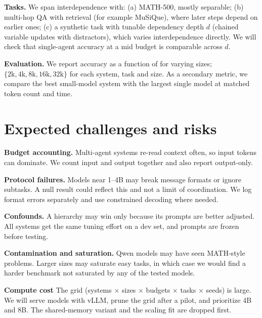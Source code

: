 \documentclass{article}
\begin{document}
\textbf{Tasks.} We span interdependence with: (a) MATH-500, mostly separable; (b) multi-hop QA with retrieval (for example MuSiQue), where later steps depend on earlier ones; (c) a synthetic task with tunable dependency depth $d$ (chained variable updates with distractors), which varies interdependence directly. We will check that single-agent accuracy at a mid budget is comparable across $d$.

\textbf{Evaluation.} We report accuracy as a function of for varying sizes; $\{2\text{k}, 4\text{k}, 8\text{k}, 16\text{k}, 32\text{k}\}$ for each system, task and size. As a secondary metric, we compare the best small-model system with the largest single model at matched token count and time. 

\section{Expected challenges and risks}

\textbf{Budget accounting.} Multi-agent systems re-read context often, so input tokens can dominate. We count input and output together and also report output-only.

\textbf{Protocol failures.} Models near 1--4B may break message formats or ignore subtasks. A null result could reflect this and not a limit of coordination. We log format errors separately and use constrained decoding where needed.

\textbf{Confounds.} A hierarchy may win only because its prompts are better adjusted. All systems get the same tuning effort on a dev set, and prompts are frozen before testing.

\textbf{Contamination and saturation.} Qwen models may have seen MATH-style problems. Larger sizes may saturate easy tasks, in which case we would find a harder benchmark not saturated by any of the tested models.

\textbf{Compute cost} The grid (systems $\times$ sizes $\times$ budgets $\times$ tasks $\times$ seeds) is large. We will serve models with vLLM, prune the grid after a pilot, and prioritize 4B and 8B. The shared-memory variant and the scaling fit are dropped first.
\end{document}
